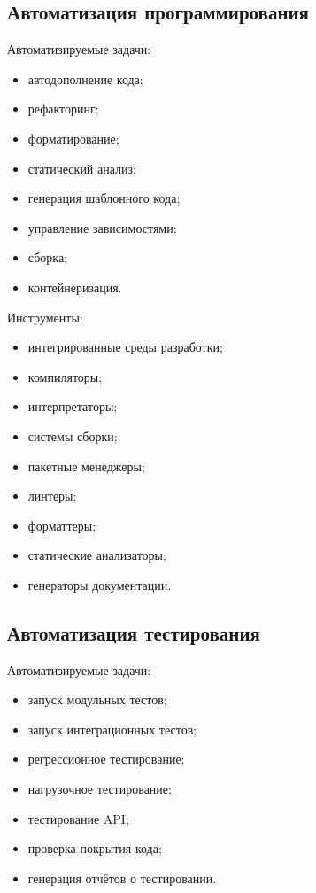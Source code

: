 \documentclass[12pt,a4paper]{article}
\begin{document}
\subsection{Автоматизация программирования}

Автоматизируемые задачи:
\begin{itemize}
    \item автодополнение кода;
    \item рефакторинг;
    \item форматирование;
    \item статический анализ;
    \item генерация шаблонного кода;
    \item управление зависимостями;
    \item сборка;
    \item контейнеризация.
\end{itemize}

Инструменты:
\begin{itemize}
    \item интегрированные среды разработки;
    \item компиляторы;
    \item интерпретаторы;
    \item системы сборки;
    \item пакетные менеджеры;
    \item линтеры;
    \item форматтеры;
    \item статические анализаторы;
    \item генераторы документации.
\end{itemize}

\subsection{Автоматизация тестирования}

Автоматизируемые задачи:
\begin{itemize}
    \item запуск модульных тестов;
    \item запуск интеграционных тестов;
    \item регрессионное тестирование;
    \item нагрузочное тестирование;
    \item тестирование API;
    \item проверка покрытия кода;
    \item генерация отчётов о тестировании.
\end{itemize}
\end{document}
